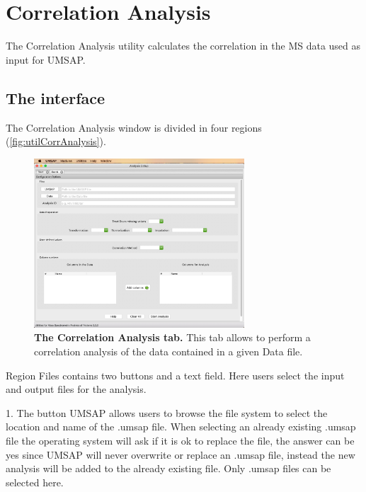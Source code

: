 \chapter{Correlation Analysis}
\label{chap:corrA}

The Correlation Analysis utility calculates the correlation in the MS data used
as input for UMSAP.

\section{The interface}

The Correlation Analysis window is divided in four regions (\autoref{fig:utilCorrAnalysis}).

\begin{figure}[h]
    \centering
    \includegraphics[width=0.7\textwidth]{./IMAGES/UTIL-CORR-WINDOW/util-corr.jpg}
    \caption[The Correlation Analysis tab]{\textbf{The Correlation Analysis tab.}
    This tab allows to perform a correlation analysis of the data contained in a
    given Data file.} 
    \label{fig:utilCorrAnalysis}
    \vspace{-5pt}
\end{figure}

Region Files contains two buttons and a text field. Here users select the input
and output files for the analysis.

\num{1}. The button UMSAP allows users to browse the file system to select the location
and name of the .umsap file. When selecting an already existing .umsap file the operating
system will ask if it is ok to replace the file, the answer can be yes since UMSAP
will never overwrite or replace an .umsap file, instead the new analysis will be
added to the already existing file. Only .umsap files can be selected here.

